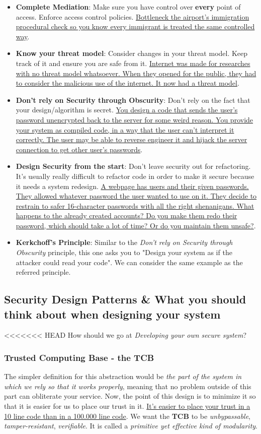 \documentclass[11pt]{article}
\begin{document}
\begin{itemize}
\item \textbf{Complete Mediation}: Make sure you have control over \textbf{every} point of access. Enforce access control policies. \uline{Bottleneck the airport's immigration procedural check so you know every immigrant is treated the same controlled way}.
\item \textbf{Know your threat model}: Consider changes in your threat model. Keep track of it and ensure you are safe from it. \uline{Internet was made for researches with no threat model whatsoever. When they opened for the public, they had to consider the malicious use of the internet. It now had a threat model}.
\item \textbf{Don't rely on Security through Obscurity}: Don't rely on the fact that your design/algorithm is secret. \uline{You design a code that sends the user's password unencrypted back to the server for some weird reason. You provide your system as compiled code, in a way that the user can't interpret it correctly. The user may be able to reverse engineer it and hijack the server connection to get other user's passwords}.
\item \textbf{Design Security from the start}: Don't leave security out for refactoring. It's usually really difficult to refactor code in order to make it secure because it needs a system redesign. \uline{A webpage has users and their given passwords. They allowed whatever password the user wanted to use on it. They decide to restrain to safer 16-character passwords with all the right shenanigans. What happens to the already created accounts? Do you make them redo their password, which should take a lot of time? Or do you maintain them unsafe?}.
\item \textbf{Kerkchoff's Principle}: Similar to the \emph{Don't rely on Security through Obscurity} principle, this one asks you to "Design your system as if the attacker could read your code". We can consider the same example as the referred principle.
\end{itemize}
\subsection{Security Design Patterns \& What you should think about when designing your system}
<<<<<<< HEAD
\label{sec:org07a6e9b}
How should we go at \emph{Developing your own secure system}?
\subsubsection{Trusted Computing Base - the \textbf{TCB}}
\label{sec:org9ad0f30}
The simpler definition for this abstraction would be \emph{the part of the system in which we rely so that it works properly}, meaning that no problem outside of this part can obliterate your service. Now, the point of this design is to minimize it so that it is easier for us to place our trust in it. \uline{It's easier to place your trust in a 10 line code than in a 100.000 line code}. We want the \textbf{TCB} to be \emph{unbypassable}, \emph{tamper-resistant}, \emph{verifiable}. It is called a \emph{primitive yet effective kind of modularity}.
\end{document}
